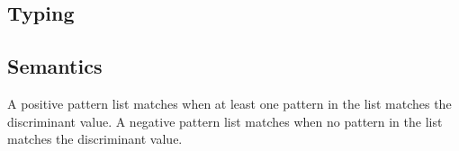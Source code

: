 \subsection{Typing}

\subsection{Semantics}

A positive pattern list matches when at least one pattern in the list matches the
discriminant value. A negative pattern list matches when no pattern in the list
matches the discriminant value.


